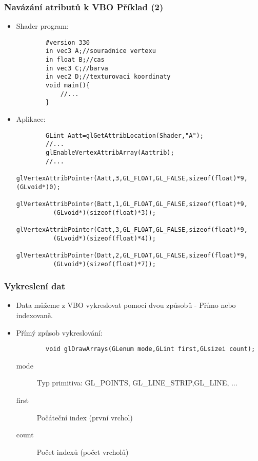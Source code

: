 \begin{frame}[fragile]
\frametitle{Navázání atributů k VBO Příklad (2)}
	\begin{itemize}
		\item{Shader program:
		{\scriptsize
		\begin{verbatim}
		#version 330
		in vec3 A;//souradnice vertexu
		in float B;//cas
		in vec3 C;//barva
		in vec2 D;//texturovaci koordinaty
		void main(){
			//...
		}
		\end{verbatim}
		}}

		\item{Aplikace:
		{\scriptsize
		\begin{verbatim}
		GLint Aatt=glGetAttribLocation(Shader,"A");
		//...
		glEnableVertexAttribArray(Aattrib);
		//...
		glVertexAttribPointer(Aatt,3,GL_FLOAT,GL_FALSE,sizeof(float)*9,(GLvoid*)0);
		glVertexAttribPointer(Batt,1,GL_FLOAT,GL_FALSE,sizeof(float)*9,
		  (GLvoid*)(sizeof(float)*3));
		glVertexAttribPointer(Catt,3,GL_FLOAT,GL_FALSE,sizeof(float)*9,
		  (GLvoid*)(sizeof(float)*4));
		glVertexAttribPointer(Datt,2,GL_FLOAT,GL_FALSE,sizeof(float)*9,
		  (GLvoid*)(sizeof(float)*7));
		\end{verbatim}
		}}

	\end{itemize}
\end{frame}

\begin{frame}[fragile]
\frametitle{Vykreslení dat}
	\begin{itemize}
		\item{Data můžeme z VBO vykreslovat pomocí dvou způsobů - Přímo nebo indexovaně.}
		\item{Přímý způsob vykreslování:
		{\scriptsize
		\begin{verbatim}
		void glDrawArrays(GLenum mode,GLint first,GLsizei count);
		\end{verbatim}
		}
		\begin{description}
		\item[mode] Typ primitiva: GL\_POINTS, GL\_LINE\_STRIP,GL\_LINE, ...
		\item[first] Počáteční index (první vrchol)
		\item[count] Počet indexů (počet vrcholů)
		\end{description}
		}
	\end{itemize}
\end{frame}

